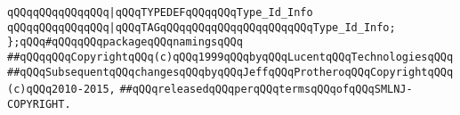 \verb|qQQqqQQqqQQqqQQq|\verb#|qQQqTYPEDEFqQQqqQQqType_Id_Info#\newline
\verb|qQQqqQQqqQQqqQQq|\verb#|qQQqTAGqQQqqQQqqQQqqQQqqQQqqQQqType_Id_Info;#\newline
\newline
\verb|};qQQq#qQQqqQQqpackageqQQqnamingsqQQq|\newline
\newline
\newline
\verb|##qQQqqQQqCopyrightqQQq(c)qQQq1999qQQqbyqQQqLucentqQQqTechnologiesqQQq|\newline
\verb|##qQQqSubsequentqQQqchangesqQQqbyqQQqJeffqQQqProtheroqQQqCopyrightqQQq(c)qQQq2010-2015,|\newline
\verb|##qQQqreleasedqQQqperqQQqtermsqQQqofqQQqSMLNJ-COPYRIGHT.|\newline


